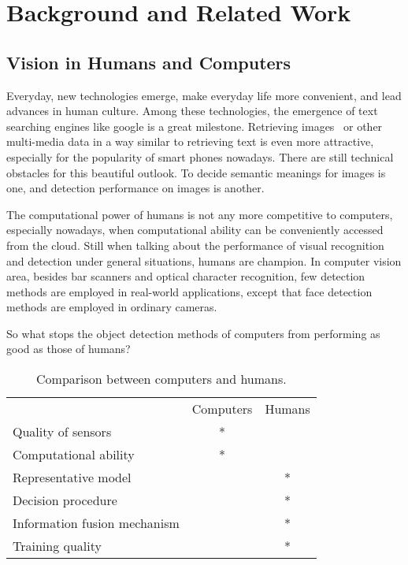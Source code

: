 \chapter{Background and Related Work}
\label{chp2}

\section{Vision in Humans and Computers}

Everyday, new technologies emerge, make everyday life more convenient, and lead advances in human culture. Among these technologies, the emergence of text searching engines like google is a great milestone. Retrieving images~\citep{bisearch} or other multi-media data  in a way similar to retrieving text is even more attractive, especially for the popularity of smart phones nowadays. There are still technical obstacles for this beautiful outlook. To decide semantic meanings for images is one, and detection performance on images is another.



The computational power of humans is not any more competitive to computers, especially nowadays, when computational ability can be conveniently accessed from the cloud.
Still when talking about the performance of visual recognition and detection under general situations, humans are champion. In computer vision area, besides bar scanners and optical character recognition, few detection methods are employed in real-world applications, except that face detection methods are employed in ordinary cameras.

So what stops the object detection methods of computers from performing as good as those of humans?

\begin{table}[h]
\centering
\begin{tabular}{lcc}
     \hline
     \hline
                               &	Computers & Humans \\
    Quality of sensors         &	* &   \\
    Computational ability      &	* &	  \\
    Representative model       &	  & * \\
    Decision procedure         &      & *	  \\
    Information fusion mechanism & & *           \\
    Training quality           &      & *	   \\
   \hline
\end{tabular}
\caption[Power comparison between computers and humans]{Comparison between computers and humans.}\label{c2tb:tb1}
\end{table}

